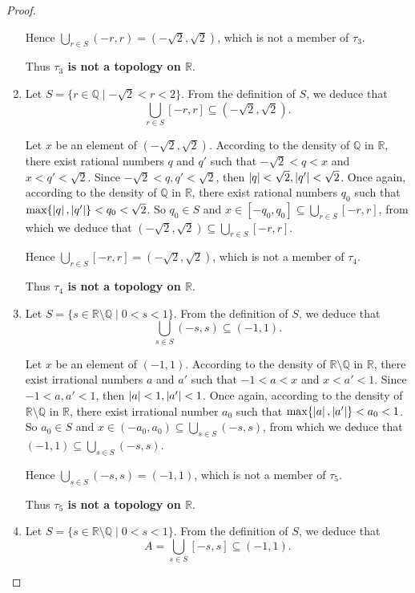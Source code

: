\begin{proof}
\begin{enumerate}[label={(\roman*)}]
		      Hence $\bigcup_{r\in S} (-r, r) = (-\sqrt{2}, \sqrt{2})$, which is not a member of $\tau_{3}$.

		      Thus \textbf{$\tau_{3}$ is not a topology on $\mathbb{R}$}.
		\item Let $S = \{ r\in\mathbb{Q} \mid -\sqrt{2} < r < 2 \}$. From the definition of $S$, we deduce that
		      \[
			      \bigcup_{r\in S} [-r, r]\subseteq (-\sqrt{2}, \sqrt{2}).
		      \]

		      Let $x$ be an element of $(-\sqrt{2}, \sqrt{2})$. According to the density of $\mathbb{Q}$ in $\mathbb{R}$, there exist rational numbers $q$ and $q'$ such that $-\sqrt{2} < q < x$ and $x < q' < \sqrt{2}$. Since $-\sqrt{2} < q, q' < \sqrt{2}$, then $\left\vert{q}\right\vert < \sqrt{2}, \left\vert{q'}\right\vert < \sqrt{2}$. Once again, according to the density of $\mathbb{Q}$ in $\mathbb{R}$, there exist rational numbers $q_{0}$ such that $\max\{ \left\vert{q}\right\vert, \left\vert{q'}\right\vert \} < q_{0} < \sqrt{2}$. So $q_{0}\in S$ and $x\in [-q_{0}, q_{0}]\subseteq \bigcup_{r\in S} [-r, r]$, from which we deduce that $(-\sqrt{2}, \sqrt{2})\subseteq \bigcup_{r\in S}[-r, r]$.

		      Hence $\bigcup_{r\in S} [-r, r] = (-\sqrt{2}, \sqrt{2})$, which is not a member of $\tau_{4}$.

		      Thus \textbf{$\tau_{4}$ is not a topology on $\mathbb{R}$}.
		\item Let $S = \{ s\in\mathbb{R}\setminus\mathbb{Q} \mid 0 < s < 1 \}$. From the definition of $S$, we deduce that
		      \[
			      \bigcup_{s\in S} (-s, s)\subseteq (-1, 1).
		      \]

		      Let $x$ be an element of $(-1, 1)$. According to the density of $\mathbb{R}\setminus\mathbb{Q}$ in $\mathbb{R}$, there exist irrational numbers $a$ and $a'$ such that $-1 < a < x$ and $x < a' < 1$. Since $-1 < a, a' < 1$, then $\left\vert{a}\right\vert < 1, \left\vert{a'}\right\vert < 1$. Once again, according to the density of $\mathbb{R}\setminus\mathbb{Q}$ in $\mathbb{R}$, there exist irrational number $a_{0}$ such that $\max\{ \left\vert{a}\right\vert, \left\vert{a'}\right\vert \} < a_{0} < 1$. So $a_{0}\in S$ and $x\in (-a_{0}, a_{0})\subseteq \bigcup_{s\in S} (-s, s)$, from which we deduce that $(-1, 1)\subseteq \bigcup_{s\in S}(-s, s)$.

		      Hence $\bigcup_{s\in S} (-s, s) = (-1, 1)$, which is not a member of $\tau_{5}$.

		      Thus \textbf{$\tau_{5}$ is not a topology on $\mathbb{R}$}.
		\item Let $S = \{ s\in\mathbb{R}\setminus\mathbb{Q} \mid 0 < s < 1 \}$. From the definition of $S$, we deduce that
		      \[
			      A = \bigcup_{s\in S} [-s, s]\subseteq (-1, 1).
		      \]


\end{enumerate}
\end{proof}

